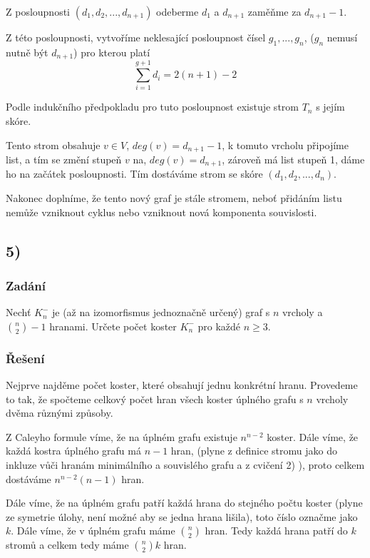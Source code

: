 \documentclass[../main.tex]{subfiles}
\begin{document}
Z posloupnosti $(d_1, d_2, ..., d_{n+1})$ odeberme $d_1$ a $d_{n+1}$ zaměňme za $d_{n+1} -1$.

Z této posloupnosti, vytvoříme neklesající posloupnost čísel $g_1, ..., g_n$, ($g_n$ nemusí nutně být $d_{n+1}$) pro kterou platí 
\begin{equation*}
    \sum_{i=1}^{g+1} d_i = 2(n+1) - 2
\end{equation*}

Podle indukčního předpokladu pro tuto posloupnost existuje strom $T_n$ s jejím skóre.

Tento strom obsahuje $v\in V$, $deg(v) = d_{n+1} - 1$, k tomuto vrcholu připojíme list, 
a tím se změní stupeň $v$ na, $deg(v) = d_{n+1}$, zároveň má list stupeň 1, dáme ho na začátek posloupnosti. Tím dostáváme strom se skóre
$(d_1, d_2, ..., d_n)$.

Nakonec doplníme, že tento nový graf je stále stromem, neboť přidáním listu nemůže vzniknout cyklus nebo vzniknout nová komponenta souvislosti.



\subsection{5)}
\subsubsection*{Zadání}

Nechť $K_n^-$ je (až na izomorfismus jednoznačně určený) graf s $n$ vrcholy a $\binom{n}{2} -1$ hranami.
Určete počet koster $K_n^-$ pro každé $n\geq 3$.

\subsubsection*{Řešení}


Nejprve najděme počet koster, které obsahují jednu konkrétní hranu. 
Provedeme to tak, že spočteme celkový počet hran všech koster úplného grafu s $n$ vrcholy dvěma různými způsoby. 

Z Caleyho formule víme, že na úplném grafu existuje $n^{n-2}$ koster. Dále víme, že každá kostra úplného grafu má $n-1$ hran, 
(plyne z definice stromu jako do inkluze vůči hranám minimálního a souvislého grafu a z cvičení 2) ), proto celkem dostáváme $n^{n-2}(n-1)$ hran.

Dále víme, že na úplném grafu patří každá hrana do stejného počtu koster 
(plyne ze symetrie úlohy, není možné aby se jedna hrana lišila), toto číslo označme
jako $k$. Dále víme, že v úplném grafu máme $\binom{n}{2}$ hran. Tedy každá hrana patří do $k$ stromů a celkem tedy máme $\binom{n}{2}k$ hran.
\end{document}
